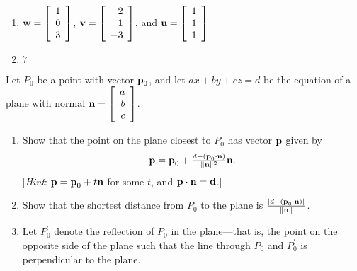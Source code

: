 \begin{multicols}{2}
\begin{ex}
\begin{enumerate}[label={\alph*.}]
\item 
$\textbf{w} = \left[
\begin{array}{r}
1\\
0\\
3
\end{array}
\right]$, 
$\textbf{v} = \left[
\begin{array}{r}
2\\
1\\
-3
\end{array}
\right]$, and 
$\textbf{u} = \left[
\begin{array}{r}
1\\
1\\
1
\end{array}
\right]$

\end{enumerate}
\begin{sol}
\begin{enumerate}[label={\alph*.}]
\setcounter{enumi}{1}
\item $7$

\end{enumerate}
\end{sol}
\end{ex}

\begin{ex}
Let $P_{0}$ be a point with vector $\textbf{p}_{0}$, and let $ax + by + cz = d$ be the equation of a plane with normal 
$\textbf{n} = \left[
\begin{array}{r}
a\\
b\\
c
\end{array}
\right]$.

\begin{enumerate}[label={\alph*.}]
\item Show that the point on the plane closest to $P_{0}$ has vector $\textbf{p}$ given by
\begin{equation*}
\textbf{p} = \textbf{p}_{0} + \tfrac{d - (\textbf{p}_{0} \cdot \textbf{n})}{\| \textbf{n} \|^2}\textbf{n}.
\end{equation*}
[\textit{Hint}: $\textbf{p} = \textbf{p}_{0} + t\textbf{n}$ for some $t$, and $\textbf{p} \cdot \textbf{n} = \textbf{d}$.]

\item Show that the shortest distance from $P_{0}$ to the plane is $\tfrac{|d - (\textbf{p}_{0} \cdot \textbf{n})|}{\| \textbf{n} \|}$.

\item Let $P_{0}^\prime$ denote the reflection of $P_{0}$ in the plane---that is, the point on the opposite side of the plane such that the line through $P_{0}$ and $P_{0}^\prime$ is perpendicular to the plane.



\end{enumerate}
\end{ex}
\end{multicols}
